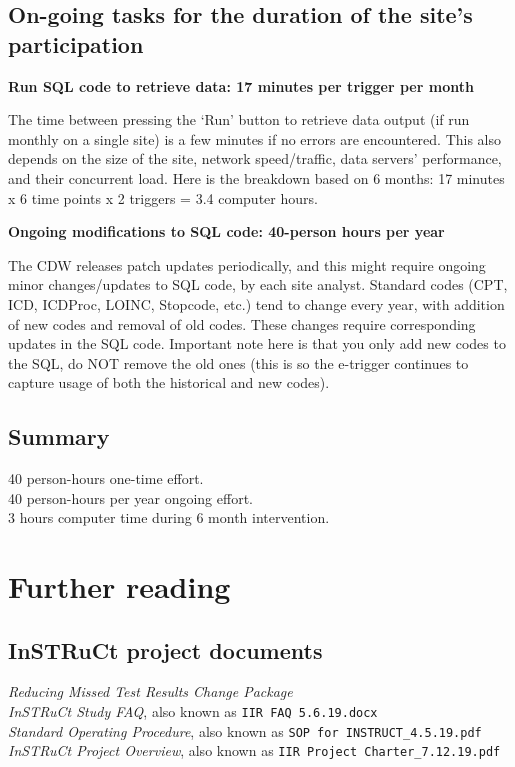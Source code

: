 \documentclass{article}
\begin{document}
\subsection{On-going tasks for the duration of the site's participation}

\noindent\textbf{Run SQL code to retrieve data: 17 minutes per trigger
  per month}

The time between pressing the `Run' button to retrieve data output (if
run monthly on a single site) is a few minutes if no errors are
encountered. This also depends on the size of the site, network
speed/traffic, data servers' performance, and their concurrent load.
Here is the breakdown based on 6 months: 17 minutes x 6 time points x
2 triggers = 3.4 computer hours.

\noindent\textbf{Ongoing modifications to SQL code: 40-person hours
  per year}

The CDW releases patch updates periodically, and this might require
ongoing minor changes/updates to SQL code, by each site analyst.
Standard codes (CPT, ICD, ICDProc, LOINC, Stopcode, etc.) tend to
change every year, with addition of new codes and removal of old
codes. These changes require corresponding updates in the SQL code.
Important note here is that you only add new codes to the SQL, do NOT
remove the old ones (this is so the e-trigger continues to capture
usage of both the historical and new codes).

\subsection{Summary}

40 person-hours one-time effort.\\
40 person-hours per year ongoing effort.\\
3 hours computer time during 6 month intervention.




\section{Further reading}

\subsection{InSTRuCt project documents}

\emph{Reducing Missed Test Results Change Package}\\
\emph{InSTRuCt Study FAQ}, also known as \texttt{IIR FAQ 5.6.19.docx}\\
\emph{Standard Operating Procedure}, also known as \texttt{SOP for
  INSTRUCT\_4.5.19.pdf}\\
\emph{InSTRuCt Project Overview}, also known as \texttt{IIR Project
  Charter\_7.12.19.pdf}
\end{document}
